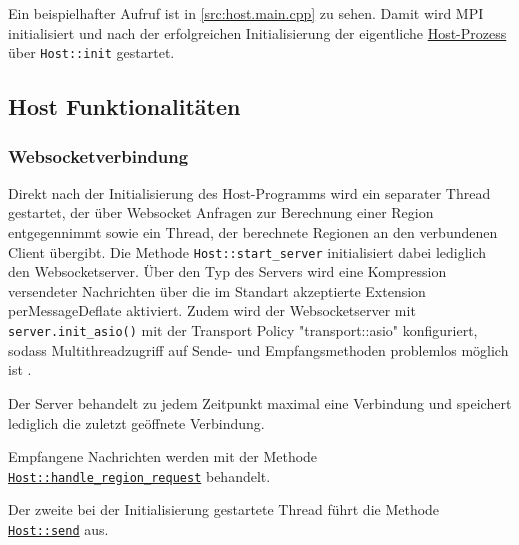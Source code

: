 Ein beispielhafter Aufruf ist in \autoref{src:host.main.cpp} zu sehen. Damit wird MPI initialisiert und nach der
erfolgreichen Initialisierung der eigentliche \hyperref[cls:Host]{Host-Prozess} über \verb|Host::init| gestartet.

\begin{figure}[h]
	
\end{figure}

\begin{figure}
	
\end{figure}

\subsection{Host Funktionalitäten}\label{cls:Host}

\subsubsection{Websocketverbindung}

Direkt nach der Initialisierung des Host-Programms wird ein separater Thread gestartet, der über Websocket
Anfragen zur Berechnung einer Region entgegennimmt sowie ein Thread, der berechnete Regionen an den verbundenen Client übergibt.
Die Methode \verb|Host::start_server| initialisiert dabei lediglich den Websocketserver.
Über den Typ des Servers wird eine Kompression versendeter Nachrichten über die im Standart akzeptierte Extension perMessageDeflate aktiviert.
Zudem wird der Websocketserver mit \verb|server.init_asio()| mit der Transport Policy "transport::asio"
konfiguriert, sodass Multithreadzugriff auf Sende- und Empfangsmethoden problemlos möglich ist \cite{websocketppManual}.

Der Server behandelt zu jedem Zeitpunkt maximal eine Verbindung und speichert lediglich die zuletzt geöffnete Verbindung.

Empfangene Nachrichten werden mit der Methode \hyperref[cls:Host::handle_region_request]{\texttt{Host::handle\_region\_request}} behandelt.

Der zweite bei der Initialisierung gestartete Thread führt die Methode \hyperref[cls:Host::send]{\texttt{Host::send}} aus.

